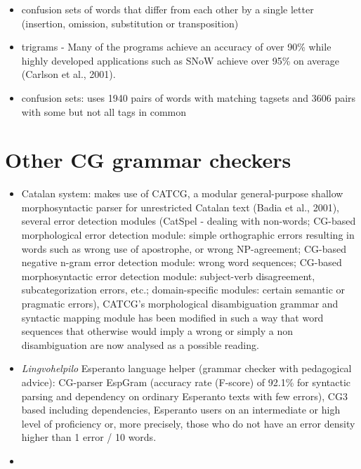 \documentclass[a4paper,english,12pt]{article}
\begin{document}
\begin{spacing}{1.0}
\begin{itemize}
\item confusion sets of words that differ from each other by a single letter (insertion, omission, substitution or transposition) \citet{Pedler2007}
\item trigrams - Many of the programs achieve an accuracy of over 90\% while highly developed applications
such as SNoW achieve over 95\% on average (Carlson et al., 2001). \citet{Pedler2007}
\item confusion sets: \citet{Pedler2007} uses 1940 pairs of words with matching tagsets and 3606 pairs with some but not all tags in common
\end{itemize}

\section{Other CG grammar checkers}

\begin{itemize}
\item Catalan system: makes use of CATCG, a modular general-purpose shallow morphosyntactic parser for unrestricted Catalan text (Badia et al., 2001), several error detection modules (CatSpel - dealing with non-words; CG-based morphological error detection module: simple orthographic errors resulting in words such as wrong use of apostrophe, or wrong NP-agreement; CG-based negative n-gram error detection module: wrong word sequences; CG-based morphosyntactic error detection module: subject-verb disagreement, subcategorization errors, etc.; domain-specific modules: certain semantic or pragmatic errors), CATCG’s morphological disambiguation grammar and syntactic mapping module has been modified in such a way that word sequences that otherwise would imply a wrong or simply a non disambiguation are now analysed as a possible reading.
\item \textit{Lingvohelpilo} Esperanto language helper (grammar checker with pedagogical advice): CG-parser EspGram (accuracy rate (F-score) of 92.1\% for syntactic parsing and dependency on ordinary Esperanto texts with few errors), CG3 based including dependencies, Esperanto users on an intermediate or high level of proficiency or, more precisely, those who do not have an error density higher than 1 error / 10 words.
\item
\end{itemize}


\end{spacing}
\end{document}
